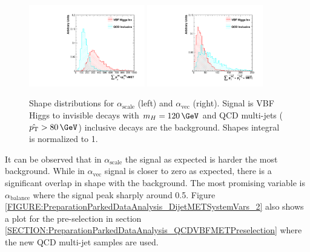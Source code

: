 \begin{figure}[!htb]
\centering
\includegraphics[width=0.45\textwidth]{Chapter06/TopologicalVariables/Images/JetPair_scalSumTriObjectPt.pdf} 
\includegraphics[width=0.45\textwidth]{Chapter06/TopologicalVariables/Images/JetPair_vecSumTriObjectPt.pdf} 
\caption{Shape distributions for $\alpha_{\text{scale}}$ (left) and $\alpha_{\text{vec}}$ (right). Signal is \gls{VBF} Higgs to invisible decays with $m_H=120\,\GeV$ and \gls{QCD} multi-jets ($\hat{\pt}>80\,\GeV$) inclusive decays are the background. Shapes integral is normalized to 1.}
\label{FIGURE:PreparationParkedDataAnalysis_DijetMETSystemVars_1}
\end{figure}

It can be observed that in $\alpha_{\text{scale}}$ the signal as expected is harder the most background. While in $\alpha_{\text{vec}}$ signal is closer to zero as expected, there is a significant overlap in shape with the background. The most promising variable is $\alpha_{\text{balance}}$ where the signal peak sharply around 0.5. Figure \ref{FIGURE:PreparationParkedDataAnalysis_DijetMETSystemVars_2} also shows a plot for the pre-selection in section \ref{SECTION:PreparationParkedDataAnalysis_QCDVBFMETPreselection} where the new \gls{QCD} multi-jet samples are used. 

